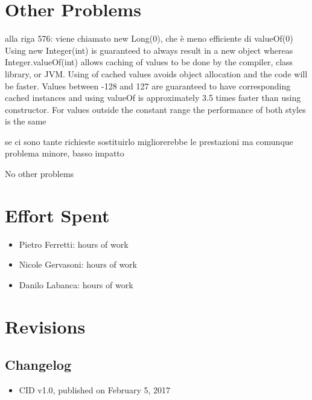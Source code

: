 \documentclass[english]{article}
\begin{document}
\section{Other Problems} %
alla riga 576:
viene chiamato new Long(0), che è meno efficiente di valueOf(0)
Using new Integer(int) is guaranteed to always result in a new object whereas Integer.valueOf(int) allows caching of values to be done by the compiler, class library, or JVM. Using of cached values avoids object allocation and the code will be faster.
Values between -128 and 127 are guaranteed to have corresponding cached instances and using valueOf is approximately 3.5 times faster than using constructor. For values outside the constant range the performance of both styles is the same

se ci sono tante richieste sostituirlo migliorerebbe le prestazioni
ma comunque problema minore, basso impatto


No other problems

\section{Effort Spent}
\begin{itemize}
	\item{Pietro Ferretti:  hours of work}
	\item{Nicole Gervasoni:  hours of work}
	\item{Danilo Labanca:  hours of work}
\end{itemize}


\section{Revisions}

\subsection{Changelog}
\begin{itemize}
	\item{CID v1.0, published on February 5, 2017}
\end{itemize}
\end{document}
